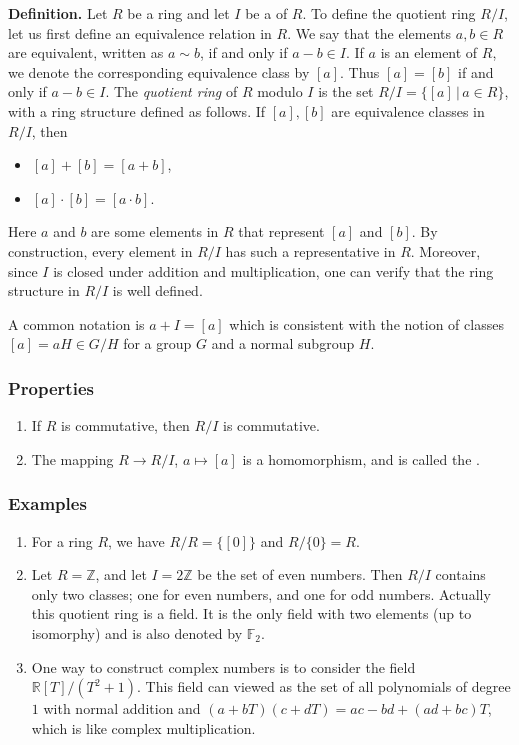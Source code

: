\documentclass[12pt]{article}
\begin{document}
{\bf Definition. }
Let $R$ be a ring and let $I$ be a  of $R$.
To define the quotient ring $R/I$, let us first
define an equivalence relation in $R$. We say that the elements $a,b\in R$
are equivalent, written as $a\sim b$, if and only if $a-b\in I$.
If $a$ is an element of $R$, we denote the corresponding equivalence
class by $[a]$. Thus $[a]=[b]$ if and only if $a-b\in I$.
The {\em quotient ring} of $R$ modulo $I$ is the set
$R/I=\{[a]\, |\, a\in R\}$, with a ring structure defined as follows.
If $[a],[b]$ are equivalence classes in $R/I$, then
 \begin{itemize}
 \item $[a]+[b] = [a+b]$,
 \item $[a]\cdot [b]=[a\cdot b]$.
 \end{itemize}
Here $a$ and $b$ are some elements in $R$ that represent $[a]$ and $[b]$.
By construction, every element in $R/I$ has such a representative in $R$.
Moreover, since $I$ is closed under addition and multiplication, one can
 verify that the ring structure in $R/I$ is well defined.

A common notation is $a+I=[a]$ which is consistent with the notion of classes $[a]=aH\in G/H$ for a group $G$ and a normal subgroup $H$.

\subsubsection*{Properties}
\begin{enumerate}
\item If $R$ is commutative, then $R/I$ is commutative.
\item The mapping $R\to R/I$, $a\mapsto [a]$ is a homomorphism, and 
is called the . 
\end{enumerate}

\subsubsection*{Examples}
\begin{enumerate}
\item For a ring $R$, we have $R/R=\{[0]\}$ and $R/\{0\}=R$.
\item Let $R=\mathbb{Z}$, and let $I=2\mathbb{Z}$ be the set of even numbers.
Then $R/I$ contains only two classes; one for  even numbers,
and one for odd numbers. Actually this quotient ring is a field. It is the only field with two elements (up to isomorphy) and is also denoted by $\mathbb{F}_2$.
\item One way to construct complex numbers is to consider the field $\mathbb{R}[T]/(T^2+1)$. This field can viewed as the set of all polynomials of degree $1$ with normal addition and $(a+bT)(c+dT)=ac-bd+(ad+bc)T$, which is like complex multiplication.
\end{enumerate}
\end{document}
